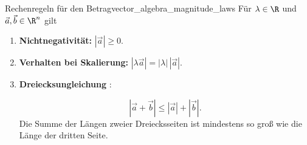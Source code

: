 \begin{TheoremBox}{Rechenregeln für den Betrag}{vector_algebra_magnitude_laws}
  Für $\lambda\in\R$ und $\vec a,\vec b\in\R^n$ gilt
  \begin{enumerate}[label=\arabic*.,leftmargin=1.8em,itemsep=0.9em]
    \item \textbf{Nichtnegativität:}
      $|\vec a|\ge0$.

    \item \textbf{Verhalten bei Skalierung:}
      $|\lambda\vec a|=|\lambda|\,|\vec a|$.

    \item \textbf{Dreiecksungleichung}
      :
      \par\smallskip
      \noindent
      \begin{minipage}[c]{0.62\linewidth}
        \[
          |\vec a+\vec b|\le|\vec a|+|\vec b|.
        \]
        Die Summe der Längen zweier Dreiecksseiten ist mindestens so groß
        wie die Länge der dritten Seite.
      \end{minipage}\hfill
      \begin{minipage}[c]{0.32\linewidth}
        \centering
      \end{minipage}
  \end{enumerate}
\end{TheoremBox}

\clearpage
